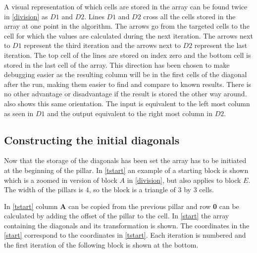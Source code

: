 A visual representation of which cells are stored in the array can be found twice in \cref{division} as $D1$ and $D2$.
Lines $D1$ and $D2$ cross all the cells stored in the array at one point in the algorithm.
The arrows go from the targeted cells to the cell for which the values are calculated during the next iteration.
The arrows next to $D1$ represent the third iteration and the arrows next to $D2$ represent the last iteration.
The top cell of the lines are stored on index zero and the bottom cell is stored in the last cell of the array.
This direction has been chosen to make debugging easier as the resulting column will be in the first cells of the diagonal after the run, making them easier to find and compare to known results.
There is no other advantage or disadvantage if the result is stored the other way around.
 also shows this same orientation.
The input is equivalent to the left most column as seen in $D1$ and the output equivalent to the right most column in $D2$.




\subsection{Constructing the initial diagonals} \label{section:initial}
Now that the storage of the diagonals has been set the array has to be initiated at the beginning of the pillar.
In \cref{tstart} an example of a starting block is shown which is a zoomed in version of block $A$ in \cref{division}, but also applies to block $E$.
The width of the pillars is $4$, so the block is a triangle of $3$ by $3$ cells.

In \cref{tstart} column \textbf{A} can be copied from the previous pillar and row \textbf{0} can be calculated by adding the offset of the pillar to the cell.
In \cref{start} the array containing the diagonals and its transformation is shown.
The coordinates in the \cref{start} correspond to the coordinates in \cref{tstart}.
Each iteration is numbered and the first iteration of the following block is shown at the bottom.

